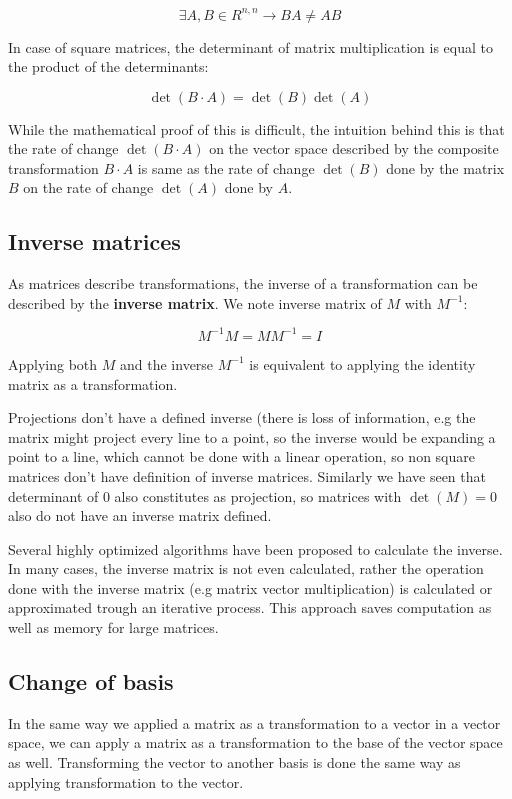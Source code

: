 \[\exists A, B \in R^{n,n} \rightarrow B A \neq A B\]

In case of square matrices, the determinant of matrix multiplication is equal to the product of the determinants:

\[\det(B \cdot A) = \det(B) \det(A)\]

While the mathematical proof of this is difficult, the intuition behind this is that the rate of change \(\det(B \cdot A)\) on the vector space described by the composite transformation \(B \cdot A\) is same as the rate of change \(\det(B)\) done by the matrix \(B\) on the rate of change \(\det(A)\) done by \(A\).

\subsection{Inverse matrices}

As matrices describe transformations, the inverse of a transformation can be described by the \textbf{inverse matrix}. We note inverse matrix of \(M\) with \(M^{-1}\):

\[M^{-1}M = MM^{-1} = I\]

Applying both \(M\) and the inverse \(M^{-1}\) is equivalent to applying the identity matrix as a transformation.

Projections don't have a defined inverse (there is loss of information, e.g the matrix might project every line to a point, so the inverse would be expanding a point to a line, which cannot be done with a linear operation, so non square matrices don't have definition of inverse matrices. Similarly we have seen that determinant of \(0\) also constitutes as projection, so matrices with \(\det(M) = 0\) also do not have an inverse matrix defined.

Several highly optimized algorithms have been proposed to calculate the inverse. In many cases, the inverse matrix is not even calculated, rather the operation done with the inverse matrix (e.g matrix vector multiplication) is calculated or approximated trough an iterative process. This approach saves computation as well as memory for large matrices.

\subsection{Change of basis}

In the same way we applied a matrix as a transformation to a vector in a vector space, we can apply a matrix as a transformation to the base of the vector space as well. Transforming the vector to another basis is done the same way as applying transformation to the vector.

